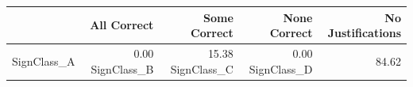 \begin{tabular}{lrrrr}
\toprule
 & All Correct & Some Correct & None Correct & No Justifications \\
\midrule
SignClass_A & 0.00%
SignClass_B & 15.38%
SignClass_C & 0.00%
SignClass_D & 84.62%
\bottomrule
\end{tabular}

